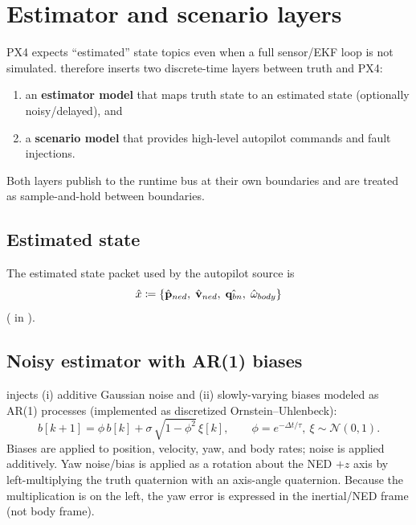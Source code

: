 \section{Estimator and scenario layers}
\label{sec:estimator-scenario}

PX4 expects ``estimated'' state topics even when a full sensor/EKF loop is not simulated.  therefore inserts two discrete-time layers between truth and PX4:
\begin{enumerate}[leftmargin=*,itemsep=2pt]
  \item an \textbf{estimator model} that maps truth state to an estimated state (optionally noisy/delayed), and
  \item a \textbf{scenario model} that provides high-level autopilot commands and fault injections.
\end{enumerate}

Both layers publish to the runtime bus at their own boundaries and are treated as sample-and-hold between boundaries.

\subsection{Estimated state}

The estimated state packet used by the autopilot source is
\begin{equation}
  \hat{x} \coloneqq \{\hat{\mathbf{p}}_{ned},\; \hat{\mathbf{v}}_{ned},\; \hat{\mathbf{q}_{bn}},\; \hat{\mathbf{\omega}}_{body}\}
\end{equation}
( in ).

\subsection{Noisy estimator with AR(1) biases}

 injects (i) additive Gaussian noise and (ii) slowly-varying biases modeled as AR(1) processes (implemented as discretized Ornstein--Uhlenbeck):
\begin{equation}
  b[k{+}1] = \phi\,b[k] + \sigma\,\sqrt{1-\phi^2}\,\xi[k],\qquad \phi = e^{-\Delta t/\tau},\ \xi\sim\mathcal{N}(0,1).
\end{equation}
Biases are applied to position, velocity, yaw, and body rates; noise is applied additively. Yaw noise/bias is applied as a rotation about the NED $+z$ axis by left-multiplying the truth quaternion with an axis-angle quaternion. Because the multiplication is on the left, the yaw error is expressed in the inertial/NED frame (not body frame).

